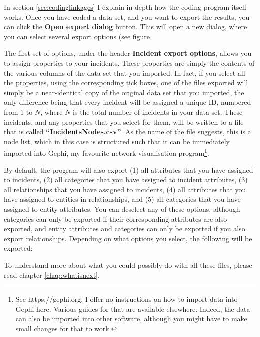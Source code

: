 \documentclass{memoir}
\begin{document}
In section \ref{sec:codinglinkages} I explain in depth how the coding program itself works. Once you have coded a data set, and you want to export the results, you can click the \textbf{Open export dialog} button. This will open a new dialog, where you can select several export options (see figure %


The first set of options, under the header \textbf{Incident export options}, allows you to assign properties to your incidents. These properties are simply the contents of the various columns of the data set that you imported. In fact, if you select all the properties, using the corresponding tick boxes, one of the files exported will simply be a near-identical copy of the original data set that you imported, the only difference being that every incident will be assigned a unique ID, numbered from 1 to \(N\), where \(N\) is the total number of incidents in your data set. These incidents, and any properties that you select for them, will be written to a file that is called \textbf{``Incidents\textunderscore Nodes.csv''}. As the name of the file suggests, this is a node list, which in this case is structured such that it can be immediately imported into Gephi, my favourite network visualisation program\footnote{See https://gephi.org. I offer no instructions on how to import data into Gephi here. Various guides for that are available elsewhere. Indeed, the data can also be imported into other software, although you might have to make small changes for that to work.}. 

By default, the program will also export (1) all attributes that you have assigned to incidents, (2) all categories that you have assigned to incident attributes, (3) all relationships that you have assigned to incidents, (4) all attributes that you have assigned to entities in relationships, and (5) all categories that you have assigned to entity attributes. You can deselect any of these options, although categories can only be exported if their corresponding attributes are also exported, and entity attributes and categories can only be exported if you also export relationships. Depending on what options you select, the following will be exported:

To understand more about what you could possibly do with all these files, please read chapter \ref{chap:whatisnext}.
\end{document}

